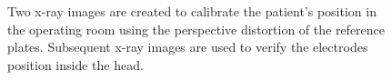 \documentclass[journal]{vgtc}                %
\begin{document}
\begin{figure}[b]
    \centering
    \hspace*{0.2cm}
    \caption{Two x-ray images are created to calibrate the patient's position in the operating room using the perspective distortion of the reference plates. Subsequent x-ray images are used to verify the electrodes position inside the head.}
    \label{fig:xrayreferencescans}
\end{figure}
\end{document}
